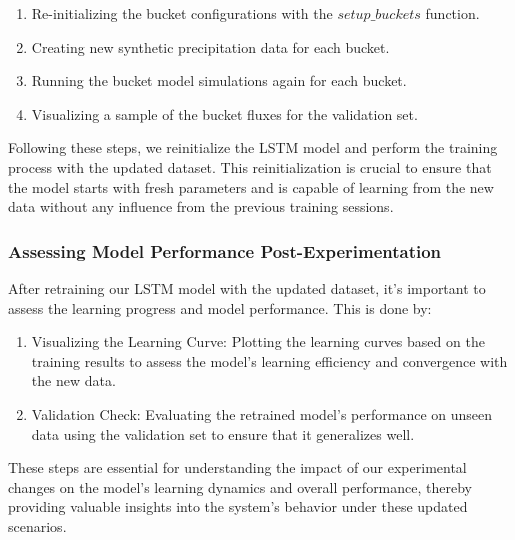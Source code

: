 \documentclass{article}
\begin{document}
    \begin{enumerate}
        \item Re-initializing the bucket configurations with the $setup\_buckets$ function.
        \item Creating new synthetic precipitation data for each bucket.
        \item Running the bucket model simulations again for each bucket.
        \item Visualizing a sample of the bucket fluxes for the validation set.
    \end{enumerate}

Following these steps, we reinitialize the LSTM model and perform the training process with the updated dataset. This reinitialization is crucial to ensure that the model starts with fresh parameters and is capable of learning from the new data without any influence from the previous training sessions.

\subsubsection{Assessing Model Performance Post-Experimentation}
After retraining our LSTM model with the updated dataset, it's important to assess the learning progress and model performance. This is done by:

    \begin{enumerate}
        \item Visualizing the Learning Curve: Plotting the learning curves based on the training results to assess the model's learning efficiency and convergence with the new data.
        \item Validation Check: Evaluating the retrained model's performance on unseen data using the validation set to ensure that it generalizes well.
    \end{enumerate}

These steps are essential for understanding the impact of our experimental changes on the model's learning dynamics and overall performance, thereby providing valuable insights into the system's behavior under these updated scenarios.


\end{document}
